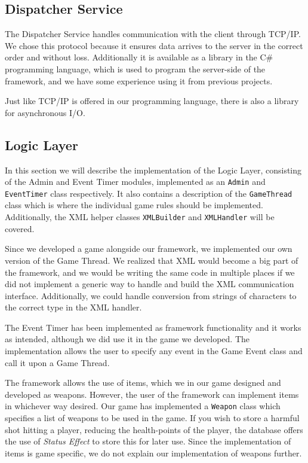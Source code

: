 \subsection{Dispatcher Service}
The Dispatcher Service handles communication with the client through TCP/IP. We chose this protocol because it ensures data arrives to the server in the correct order and without loss. Additionally it is available as a library in the C\# programming language, which is used to program the server-side of the framework, and we have some experience using it from previous projects. 

Just like TCP/IP is offered in our programming language, there is also a library for asynchronous I/O. 





\subsection{Logic Layer}
In this section we will describe the implementation of the Logic Layer, consisting of the Admin and Event Timer modules, implemented as an \texttt{Admin} and \texttt{EventTimer} class respectively. It also contains a description of the \texttt{GameThread} class which is where the individual game rules should be implemented. Additionally, the XML helper classes \texttt{XMLBuilder} and \texttt{XMLHandler} will be covered.

Since we developed a game alongside our framework, we implemented our own version of the Game Thread. We realized that XML would become a big part of the framework, and we would be writing the same code in multiple places if we did not implement a generic way to handle and build the XML communication interface. Additionally, we could handle conversion from strings of characters to the correct type in the XML handler. 

The Event Timer has been implemented as framework functionality and it works as intended, although we did use it in the game we developed. The implementation allows the user to specify any event in the Game Event class and call it upon a Game Thread. 

The framework allows the use of items, which we in our game designed and developed as weapons. However, the user of the framework can implement items in whichever way desired. Our game has implemented a \texttt{Weapon} class which specifies a list of weapons to be used in the game. If you wish to store a harmful shot hitting a player, reducing the health-points of the player, the database offers the use of \textit{Status Effect} to store this for later use. Since the implementation of items is game specific, we do not explain our implementation of weapons further.


